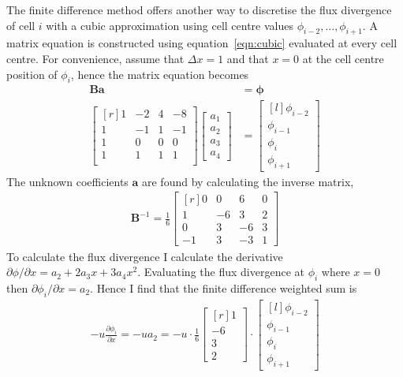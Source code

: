\documentclass{article}
\begin{document}
The finite difference method offers another way to discretise the flux divergence of cell $i$ with a cubic approximation using cell centre values $\phi_{i-2}, \ldots, \phi_{i+1}$.  A matrix equation is constructed using equation~\eqref{eqn:cubic} evaluated at every cell centre.  For convenience, assume that $\Delta x = 1$ and that $x=0$ at the cell centre position of $\phi_i$, hence the matrix equation becomes
\begin{align}
	\mathbf{B} \mathbf{a} &= \bm{\phi} \\
	\begin{bmatrix*}[r]
		1 & -2 & 4 & -8 \\
		1 & -1 & 1 & -1 \\
		1 &  0 & 0 &  0\\
		1 &  1 & 1 &  1\\
	\end{bmatrix*}
	\begin{bmatrix}
		a_1 \\
		a_2 \\
		a_3 \\
		a_4
	\end{bmatrix}
	&=
	\begin{bmatrix*}[l]
		\phi_{i-2} \\
		\phi_{i-1} \\
		\phi_i \\
		\phi_{i+1}
	\end{bmatrix*}
\end{align}
The unknown coefficients $\mathbf{a}$ are found by calculating the inverse matrix,
\begin{align}
	\mathbf{B}^{-1} = 
	\frac{1}{6}
	\begin{bmatrix*}[r]
		0 & 0 & 6 & 0 \\
		1 & -6 & 3 & 2 \\
		0 & 3 & -6 & 3 \\
		-1 & 3 & -3 & 1
	\end{bmatrix*}
\end{align}
To calculate the flux divergence I calculate the derivative $\partial \phi / \partial x = a_2 + 2 a_3 x + 3 a_4 x^2$.  Evaluating the flux divergence at $\phi_i$ where $x=0$ then $\partial \phi_i / \partial x = a_2$.  Hence I find that the finite difference weighted sum is
\begin{align}
	-u \frac{\partial \phi_i}{\partial x} = -u a_2 =
	-u \cdot \frac{1}{6}
	\begin{bmatrix*}[r]
		1 \\ -6 \\ 3 \\ 2
	\end{bmatrix*}
	\cdot
	\begin{bmatrix*}[l]
		\phi_{i-2} \\
		\phi_{i-1} \\
		\phi_i \\
		\phi_{i+1}
	\end{bmatrix*} \label{eqn:fd-fluxdiv}
\end{align}
\end{document}
